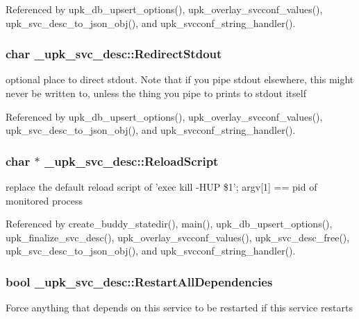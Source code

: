 Referenced by upk\_\-db\_\-upsert\_\-options(), upk\_\-overlay\_\-svcconf\_\-values(), upk\_\-svc\_\-desc\_\-to\_\-json\_\-obj(), and upk\_\-svcconf\_\-string\_\-handler().

\subsubsection[{RedirectStdout}]{\setlength{\rightskip}{0pt plus 5cm}char {\bf \_\-upk\_\-svc\_\-desc::RedirectStdout}}\label{struct__upk__svc__desc_a5d47b845d73d56050bd158fb5f632bb2}
optional place to direct stdout. Note that if you pipe stdout elsewhere, this might never be written to, unless the thing you pipe to prints to stdout itself 

Referenced by upk\_\-db\_\-upsert\_\-options(), upk\_\-overlay\_\-svcconf\_\-values(), upk\_\-svc\_\-desc\_\-to\_\-json\_\-obj(), and upk\_\-svcconf\_\-string\_\-handler().

\subsubsection[{ReloadScript}]{\setlength{\rightskip}{0pt plus 5cm}char $\ast$ {\bf \_\-upk\_\-svc\_\-desc::ReloadScript}}\label{struct__upk__svc__desc_ac632cbb663bc36b4357ac7eb967904b1}
replace the default reload script of 'exec kill -\/HUP \$1'; argv[1] == pid of monitored process 

Referenced by create\_\-buddy\_\-statedir(), main(), upk\_\-db\_\-upsert\_\-options(), upk\_\-finalize\_\-svc\_\-desc(), upk\_\-overlay\_\-svcconf\_\-values(), upk\_\-svc\_\-desc\_\-free(), upk\_\-svc\_\-desc\_\-to\_\-json\_\-obj(), and upk\_\-svcconf\_\-string\_\-handler().

\subsubsection[{RestartAllDependencies}]{\setlength{\rightskip}{0pt plus 5cm}bool {\bf \_\-upk\_\-svc\_\-desc::RestartAllDependencies}}\label{struct__upk__svc__desc_aa324ad1e1dd417328d3b686187b4d536}
Force anything that depends on this service to be restarted if this service restarts 
